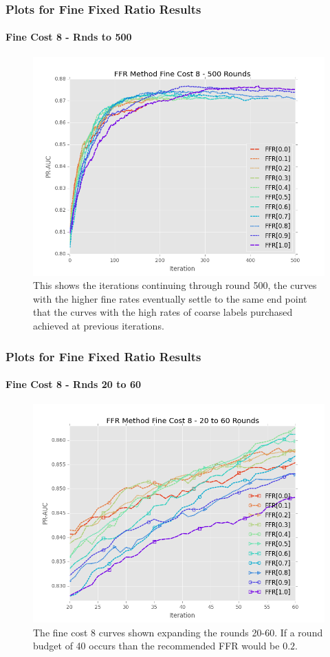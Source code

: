 \documentclass{beamer}
\begin{document}
\begin{frame}
    \frametitle{Plots for Fine Fixed Ratio Results}
    \framesubtitle{Fine Cost 8 - Rnds to 500}
    \begin{figure}[!htb]
        \centering
        \includegraphics[width=0.7\columnwidth]{fig/ParamsFFR_PR_Cost8_rnds0_500}
        \caption{This shows the iterations continuing through round 500, the curves
        with the higher fine rates eventually settle to the same end point that the
        curves with the high rates of coarse labels purchased achieved at previous
        iterations.}
        \label{fig:ParamsFFR_PR_Cost8_rnds0_500}
    \end{figure}
\end{frame}
\begin{frame}
    \frametitle{Plots for Fine Fixed Ratio Results}
    \framesubtitle{Fine Cost 8 - Rnds 20 to 60}
    \begin{figure}[!htb]
        \centering
        \includegraphics[width=0.7\columnwidth]{fig/ParamsFFR_PR_Cost8_rnds20_60}
        \caption{The fine cost 8 curves shown expanding the rounds 20-60. If a round budget of 40
        occurs than the recommended FFR would be $0.2$.}
        \label{fig:ParamsFFR_PR_Cost8_rnds20_60}
    \end{figure}
\end{frame}
\end{document}

